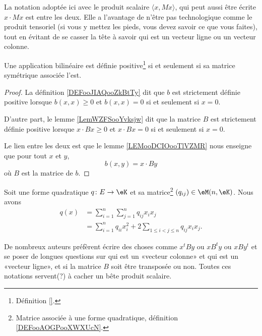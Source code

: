 La notation adoptée ici avec le produit scalaire \( \langle x, Mx\rangle \), qui peut aussi être écrite \( x\cdot Mx\) est entre les deux. Elle a l'avantage de n'être pas technologique comme le produit tensoriel (si vous y mettez les pieds, vous devez savoir ce que vous faites), tout en évitant de se casser la tête à savoir qui est un vecteur ligne ou un vecteur colonne.

\begin{proposition}     \label{PROPooUAAFooEGVDRC} \label{PROPooNQSXooVMFAtU}
    Une application bilinéaire est définie positive\footnote{Définition \ref{}.} si et seulement si sa matrice symétrique associée l'est.
\end{proposition}

\begin{proof}
    La définition \ref{DEFooJIAQooZkBtTy} dit que \( b\) est strictement définie positive lorsque \( b(x,x)\geq 0\) et \( b(x,x)=0\) si et seulement si \( x=0\).

    D'autre part, le lemme \ref{LemWZFSooYvksjw} dit que la matrice \( B\) est strictement définie positive lorsque \( x\cdot Bx\geq 0\) et \( x\cdot Bx=0\) si et seulement si \( x=0\).

    Le lien entre les deux est que le lemme \ref{LEMooDCIOooTlVZMR} nous enseigne que pour tout \( x\) et \( y\),
    \begin{equation}
        b(x,y)=x\cdot By
    \end{equation}
    où \( B\) est la matrice de \( b\).
\end{proof}

\begin{proposition}     \label{PROPooCIEUooODqfwm}
    Soit une forme quadratique \( q\colon E\to \eK\) et sa matrice\footnote{Matrice associée à une forme quadratique, définition \ref{DEFooAOGPooXWXUcN}.} \( (q_{ij})\in \eM(n,\eK)\). Nous avons
    \begin{subequations}        \label{SUBEQSooEHVXooJjKLqyiB}
        \begin{align}
            q(x)&=\sum_{i=1}^n\sum_{j=1}^nq_{ij}x_ix_j\\
            &=\sum_{i=1}^nq_{ii}x_i^2+2\sum_{1\leq i <j\leq n}q_{ij}x_ix_j.
        \end{align}
    \end{subequations}
\end{proposition}

\begin{normaltext}
    De nombreux auteurs préfèrent écrire des choses comme \( x^tBy\) ou \( xB^ty\) ou \( xBy^t\) et se poser de longues questions sur qui est un «vecteur colonne» et qui est un «vecteur ligne», et si la matrice \( B\) soit être transposée ou non. Toutes ces notations servent(?) à cacher un bête produit scalaire.
\end{normaltext}

